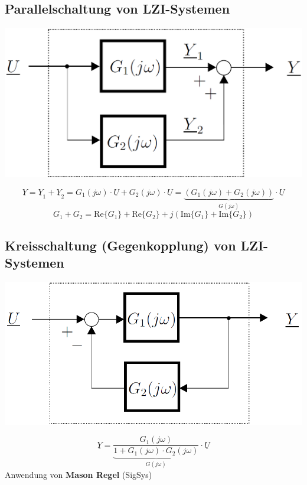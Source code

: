 \subsection{Parallelschaltung von LZI-Systemen}

\begin{center}
    \includegraphics[width=0.5\columnwidth]{images/frequenzgang_parallelschaltung.png}
\end{center}
$$ \boxed{ \underline{Y} = \underline{Y}_1 + \underline{Y}_2 = G_1(j \omega) \cdot \underline{U} + G_2(j \omega) \cdot \underline{U} 
    = \underbrace{(G_1(j \omega) + G_2(j \omega))}_{G(j \omega)} \cdot \underline{U}} $$
$$ G_1 + G_2 = \mathrm{Re}\{ G_1 \} + \mathrm{Re}\{ G_2 \} + j ( \mathrm{Im}\{ G_1 \} + \mathrm{Im}\{ G_2 \}) $$


\subsection{Kreisschaltung (Gegenkopplung) von LZI-Systemen}

\begin{minipage}[c]{0.5\columnwidth}
    \includegraphics[width=\columnwidth]{images/frequenzgang_kreisschaltung.png}
\end{minipage}
\hfill
\begin{minipage}[c]{0.48\columnwidth}
    $$ \boxed{ \underline{Y} = \underbrace{\frac{G_1(j \omega)}{1 + G_1(j \omega) \cdot G_2(j \omega)}}_{G(j \omega)} \cdot \underline{U}} $$
    \textrightarrow Anwendung von \textbf{Mason Regel} (SigSys)
\end{minipage}


